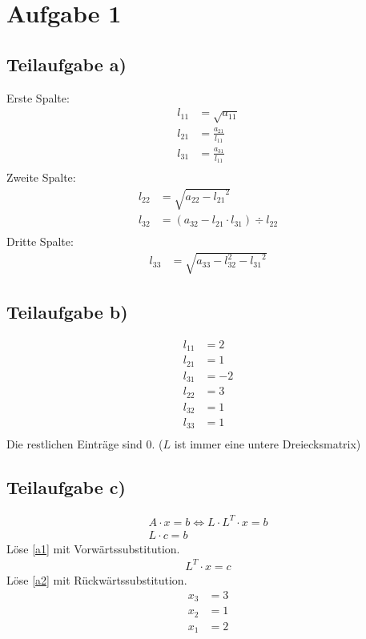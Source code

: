 \section*{Aufgabe 1}
\subsection*{Teilaufgabe a)}

Erste Spalte:
\begin{align}
	l_{11} &= \sqrt{a_{11}} \\
	l_{21} &= \frac{a_{21}}{l_{11}}\\
	l_{31} &= \frac{a_{31}}{l_{11}}\\
\end{align}
Zweite Spalte:
\begin{align}
	l_{22} &= \sqrt{a_{22} - {l_{21}}^2}\\
	l_{32} &= (a_{32} -l_{21} \cdot l_{31}) \div l_{22} \\
\end{align}
Dritte Spalte:
\begin{align}
	l_{33} &= \sqrt{a_{33}-{l_{32}^2}-{l_{31}}^2}
\end{align}

\subsection*{Teilaufgabe b)}
\begin{align}
	l_{11} &= 2 \\
	l_{21} &= 1 \\
	l_{31} &= -2 \\
	l_{22} &= 3 \\
	l_{32} &= 1 \\
	l_{33} &= 1 \\
\end{align}
Die restlichen Einträge sind $0$. ($L$ ist immer eine untere Dreiecksmatrix)

\subsection*{Teilaufgabe c)}

\begin{align}
	A \cdot x = b \Leftrightarrow L \cdot L^T \cdot x = b \\
	L \cdot c = b \label{a1}
\end{align}
Löse \ref{a1} mit Vorwärtssubstitution.
\begin{align}
	L^T \cdot x = c \label{a2}
\end{align}
Löse \ref{a2} mit Rückwärtssubstitution.
\begin{align}
	x_3 &= 3 \\
	x_2 &= 1 \\
	x_1 &= 2
\end{align}

